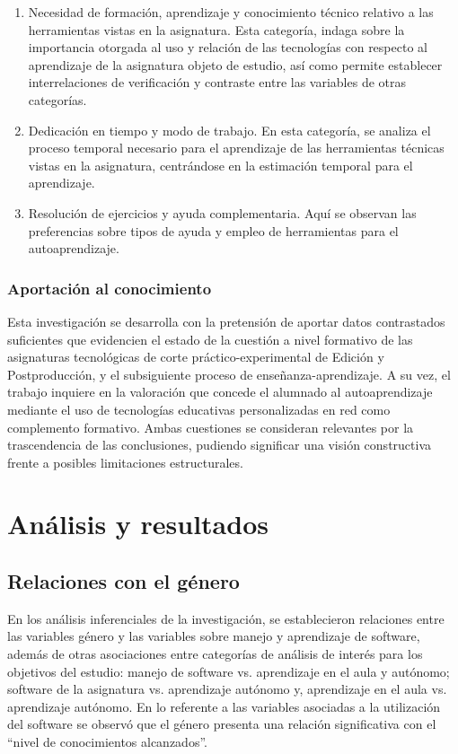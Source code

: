 \documentclass[spanish]{textolivre}
\begin{document}
\begin{enumerate}
    \item Necesidad de formación, aprendizaje y conocimiento técnico relativo a las herramientas vistas en la asignatura. Esta categoría, indaga sobre la importancia otorgada al uso y relación de las tecnologías con respecto al aprendizaje de la asignatura objeto de estudio, así como permite establecer interrelaciones de verificación y contraste entre las variables de otras categorías. 
    \item Dedicación en tiempo y modo de trabajo. En esta categoría, se analiza el proceso temporal necesario para el aprendizaje de las herramientas técnicas vistas en la asignatura, centrándose en la estimación temporal para el aprendizaje. 
    \item Resolución de ejercicios y ayuda complementaria. Aquí se observan las preferencias sobre tipos de ayuda y empleo de herramientas para el autoaprendizaje.
\end{enumerate}

\subsubsection{Aportación al conocimiento}\label{sec-titulo}
Esta investigación se desarrolla con la pretensión de aportar datos contrastados suficientes que evidencien el estado de la cuestión a nivel formativo de las asignaturas tecnológicas de corte práctico-experimental de Edición y Postproducción, y el subsiguiente proceso de enseñanza-aprendizaje. A su vez, el trabajo inquiere en la valoración que concede el alumnado al autoaprendizaje mediante el uso de tecnologías educativas personalizadas en red como complemento formativo. Ambas cuestiones se consideran relevantes por la trascendencia de las conclusiones, pudiendo significar una visión constructiva frente a posibles limitaciones estructurales. 

\section{Análisis y resultados}\label{sec-autores}
\subsection{Relaciones con el género}
En los análisis inferenciales de la investigación, se establecieron relaciones entre las variables género y las variables sobre manejo y aprendizaje de software, además de otras asociaciones entre categorías de análisis de interés para los objetivos del estudio: manejo de software vs. aprendizaje en el aula y autónomo; software de la asignatura vs. aprendizaje autónomo y, aprendizaje en el aula vs. aprendizaje autónomo. En lo referente a las variables asociadas a la utilización del software se observó que el género presenta una relación significativa con el “nivel de conocimientos alcanzados”.
\end{document}
